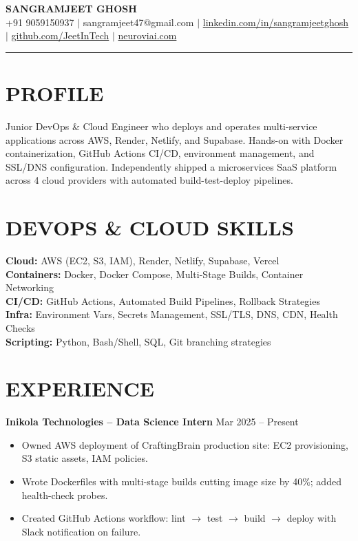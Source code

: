 \documentclass[10pt]{article}
\begin{document}
\begin{center}
{\Large \textbf{SANGRAMJEET GHOSH}} \\[2pt]
{\small +91 9059150937 $|$ sangramjeet47@gmail.com $|$
\href{https://www.linkedin.com/in/sangramjeetghosh}{linkedin.com/in/sangramjeetghosh} $|$
\href{https://github.com/JeetInTech}{github.com/JeetInTech} $|$
\href{https://neuroviai.com}{neuroviai.com}}
\end{center}

\noindent\rule{\textwidth}{0.4pt}

\section*{PROFILE}
Junior DevOps \& Cloud Engineer who deploys and operates multi-service applications across AWS, Render, Netlify, and Supabase. Hands-on with Docker containerization, GitHub Actions CI/CD, environment management, and SSL/DNS configuration. Independently shipped a microservices SaaS platform across 4 cloud providers with automated build-test-deploy pipelines.

\section*{DEVOPS \& CLOUD SKILLS}
\textbf{Cloud:} AWS (EC2, S3, IAM), Render, Netlify, Supabase, Vercel \\
\textbf{Containers:} Docker, Docker Compose, Multi-Stage Builds, Container Networking \\
\textbf{CI/CD:} GitHub Actions, Automated Build Pipelines, Rollback Strategies \\
\textbf{Infra:} Environment Vars, Secrets Management, SSL/TLS, DNS, CDN, Health Checks \\
\textbf{Scripting:} Python, Bash/Shell, SQL, Git branching strategies

\section*{EXPERIENCE}
\textbf{Inikola Technologies -- Data Science Intern} \hfill Mar 2025 -- Present
\begin{itemize}
\item Owned AWS deployment of CraftingBrain production site: EC2 provisioning, S3 static assets, IAM policies.
\item Wrote Dockerfiles with multi-stage builds cutting image size by 40\%; added health-check probes.
\item Created GitHub Actions workflow: lint $\rightarrow$ test $\rightarrow$ build $\rightarrow$ deploy with Slack notification on failure.
\end{itemize}
\end{document}

